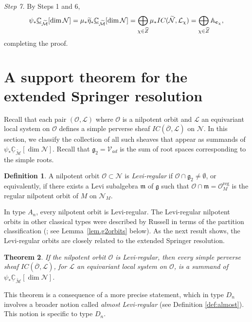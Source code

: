 \documentclass[reqno,11pt]{amsart}
\newtheorem{Thm}{Theorem}[section]
\theoremstyle{remark}
\theoremstyle{remark}
\theoremstyle{definition}
\theoremstyle{definition}
\theoremstyle{definition}
\newtheorem{Def}[Thm]{Definition}
\numberwithin{equation}{section}
\newcommand{\A}{\mathbb{ A}}
\newcommand{\C}{\mathbb{C}}           %
\newcommand{\fg}{{\mathfrak g}}
\newcommand{\fm}{{\mathfrak m}}
\newcommand{\cl}{\mathcal{L}}
\newcommand{\cm}{\mathcal{M}}
\newcommand{\cn}{\mathcal{N}}
\newcommand{\co}{\mathcal{O}}
\newcommand{\toric}{\mathcal{V}}
\newcommand{\vc}{\mathbf{c}}
\newcommand{\shc}{\underline{\C}}
\renewcommand{\tilde}{\widetilde}
\renewcommand{\hat}{\widehat}
\newcommand{\reg}{\mathrm{reg}}
\begin{document}
\medskip

{\em Step 7.}  By Steps 1 and 6, 
$$
\psi_* \shc_{\tilde{\cm}}[\dim \cn]  = \mu_* \tilde{\eta}_*  \shc_{\tilde{\cm}}[\dim \cn] = \bigoplus_{\chi \in \hat{Z}} \mu_* IC(\tilde{\cn}, \cl_{\chi}) \\
= \bigoplus_{\chi \in \hat{Z}} \A_{\vc_{\chi}},
$$
completing the proof.






\section{A support theorem for the extended Springer resolution} \label{sec.g2.intersection}

Recall that each pair $(\co, \cl)$ where $\co$ is a nilpotent orbit and $\cl$ an equivariant local system on $\co$ defines a simple perverse sheaf $IC(\overline{\co}, \cl)$ on $\cn$. In this section, we classify the collection of all such sheaves that appear as summands of $\psi_*\shc_{\tilde{\cm}}[\dim \cn]$. Recall that $\fg_2 = \toric_{ad}$ is the sum of root spaces corresponding to the simple roots. 

\begin{Def} A nilpotent orbit $\co\subset \cn$ is \emph{Levi-regular} if $\co\cap \fg_2 \neq \emptyset$, or equivalently, if there exists a Levi subalgebra $\fm$ of $\fg$ such that $\co\cap \fm = \co^{\reg}_M$ is the regular nilpotent orbit of $M$ on $\cn_M$.
\end{Def}


 In type $A_n$, every nilpotent orbit is Levi-regular.  The Levi-regular nilpotent orbits in other classical types were described by Russell
  in terms of the partition classification (\cite[Prop.~3.1]{Russell}; see Lemma~\ref{lem.g2orbits} below).  As the next result shows, the Levi-regular
  orbits are closely related to the extended Springer resolution.

 
\begin{Thm} \label{thm.g2.intersection} 
If the nilpotent orbit $\co$ is Levi-regular, then every simple perverse sheaf $IC(\overline{\co}, \cl)$, for $\cl$ an equivariant local system on $\co$, is a summand of $\psi_*\shc_{\tilde{\cm}}[\dim \cn]$. 
\end{Thm}

This theorem is a consequence of a more precise statement, which in type $D_n$ involves a broader
notion called {\em almost Levi-regular} (see Definition \ref{def:almost}).  This notion is specific to type $D_n$.
\end{document}

